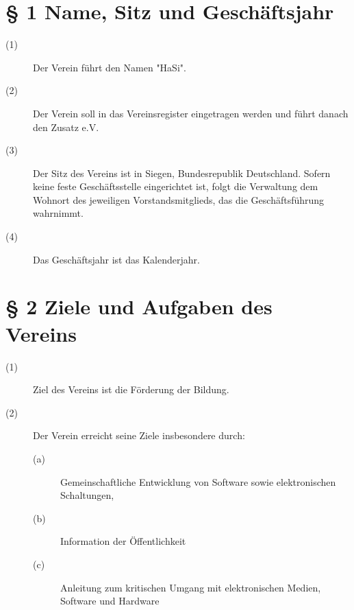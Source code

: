 \documentclass[a4paper,12pt]{scrartcl}
\begin{document}
\newpage

\tableofcontents
\thispagestyle{empty}
\clearpage



\renewcommand{\sectionmark}[1]{\markright{#1}}
\renewcommand{\subsectionmark}[1]{}
\renewcommand{\subsubsectionmark}[1]{}
\rhead{\today}

\onehalfspacing
\renewcommand{\thesection}{\arabic{section}}
\renewcommand{\thesection}{\arabic{section}}
\setcounter{section}{0}
\setcounter{page}{1}


\section*{\S{} 1 Name, Sitz und Geschäftsjahr}
\begin{description} 

\item[(1)] Der Verein führt den Namen "HaSi".
\item[(2)] Der Verein soll in das Vereinsregister eingetragen werden und führt danach den Zusatz e.V.
\item[(3)] Der Sitz des Vereins ist in Siegen, Bundesrepublik Deutschland. Sofern keine feste Geschäftsstelle eingerichtet ist, folgt die Verwaltung dem Wohnort des jeweiligen Vorstandsmitglieds, das die Geschäftsführung wahrnimmt. 
\item[(4)] Das Geschäftsjahr ist das Kalenderjahr.

\end{description}



\section*{\S{} 2 Ziele und Aufgaben des Vereins}
\begin{description} 

\item[(1)] Ziel des Vereins ist die Förderung der Bildung.
\item[(2)] Der Verein erreicht seine Ziele insbesondere durch:
\begin{description}
 \item[(a)] Gemeinschaftliche Entwicklung von Software sowie elektronischen Schaltungen,
 \item[(b)] Information der Öffentlichkeit
\item[(c)] Anleitung zum kritischen Umgang mit elektronischen Medien, Software und Hardware 
\end{description} 
\end{description}
\end{document}

